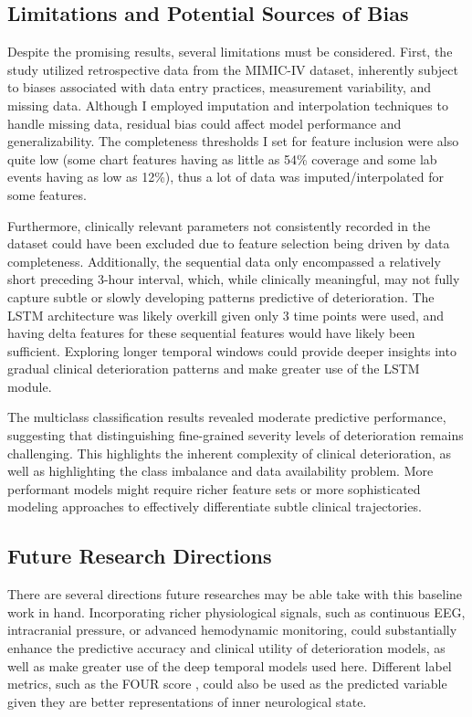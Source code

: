 \documentclass[conference]{IEEEtran}
\begin{document}
\subsection{Limitations and Potential Sources of Bias}

Despite the promising results, several limitations must be considered. First, the study utilized retrospective data from the MIMIC-IV dataset, inherently subject to biases associated with data entry practices, measurement variability, and missing data. Although I employed imputation and interpolation techniques to handle missing data, residual bias could affect model performance and generalizability. The completeness thresholds I set for feature inclusion were also quite low (some chart features having as little as 54\% coverage and some lab events having as low as 12\%), thus a lot of data was imputed/interpolated for some features.

Furthermore, clinically relevant parameters not consistently recorded in the dataset could have been excluded due to feature selection being driven by data completeness. Additionally, the sequential data only encompassed a relatively short preceding 3-hour interval, which, while clinically meaningful, may not fully capture subtle or slowly developing patterns predictive of deterioration. The LSTM architecture was likely overkill given only 3 time points were used, and having delta features for these sequential features would have likely been sufficient. Exploring longer temporal windows could provide deeper insights into gradual clinical deterioration patterns and make greater use of the LSTM module.

The multiclass classification results revealed moderate predictive performance, suggesting that distinguishing fine-grained severity levels of deterioration remains challenging. This highlights the inherent complexity of clinical deterioration, as well as highlighting the class imbalance and data availability problem. More performant models might require richer feature sets or more sophisticated modeling approaches to effectively differentiate subtle clinical trajectories.

\subsection{Future Research Directions}

There are several directions future researches may be able take with this baseline work in hand. Incorporating richer physiological signals, such as continuous EEG, intracranial pressure, or advanced hemodynamic monitoring, could substantially enhance the predictive accuracy and clinical utility of deterioration models, as well as make greater use of the deep temporal models used here. Different label metrics, such as the FOUR score \cite{schey2024gcsfour}, could also be used as the predicted variable given they are better representations of inner neurological state.
\end{document}
